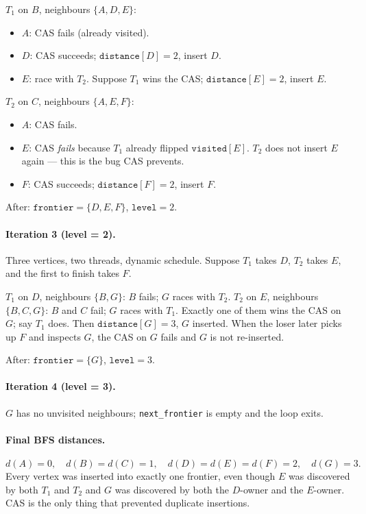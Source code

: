 \begin{ppexample}
\smallskip
$T_1$ on $B$, neighbours $\{A, D, E\}$:
\begin{itemize}
  \item $A$: CAS fails (already visited).
  \item $D$: CAS succeeds; $\texttt{distance}[D] = 2$, insert $D$.
  \item $E$: race with $T_2$.  Suppose $T_1$ wins the CAS;
        $\texttt{distance}[E] = 2$, insert $E$.
\end{itemize}

\smallskip
$T_2$ on $C$, neighbours $\{A, E, F\}$:
\begin{itemize}
  \item $A$: CAS fails.
  \item $E$: CAS \emph{fails} because $T_1$ already flipped
        $\texttt{visited}[E]$.  $T_2$ does not insert $E$ again ---
        this is the bug CAS prevents.
  \item $F$: CAS succeeds; $\texttt{distance}[F] = 2$, insert $F$.
\end{itemize}

After: $\texttt{frontier} = \{D, E, F\}$, $\texttt{level} = 2$.

\paragraph{Iteration 3 (level = 2).}
Three vertices, two threads, dynamic schedule.  Suppose $T_1$ takes
$D$, $T_2$ takes $E$, and the first to finish takes $F$.

\smallskip
$T_1$ on $D$, neighbours $\{B, G\}$: $B$ fails; $G$ races with $T_2$.
$T_2$ on $E$, neighbours $\{B, C, G\}$: $B$ and $C$ fail; $G$ races
with $T_1$.  Exactly one of them wins the CAS on $G$; say $T_1$ does.
Then $\texttt{distance}[G] = 3$, $G$ inserted.  When the loser later
picks up $F$ and inspects $G$, the CAS on $G$ fails and $G$ is not
re-inserted.

After: $\texttt{frontier} = \{G\}$, $\texttt{level} = 3$.

\paragraph{Iteration 4 (level = 3).}
$G$ has no unvisited neighbours; \texttt{next\_frontier} is empty
and the loop exits.

\paragraph{Final BFS distances.}
\[
  d(A){=}0,\quad d(B){=}d(C){=}1,\quad d(D){=}d(E){=}d(F){=}2,\quad
  d(G){=}3.
\]
Every vertex was inserted into exactly one frontier, even though $E$
was discovered by both $T_1$ and $T_2$ and $G$ was discovered by
both the $D$-owner and the $E$-owner.  CAS is the only thing that
prevented duplicate insertions.
\end{ppexample}

